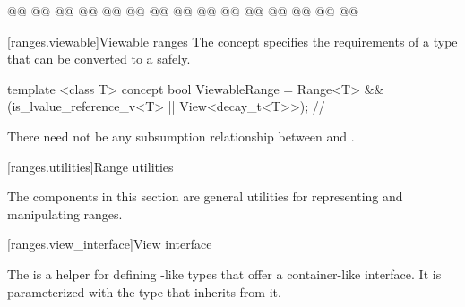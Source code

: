 \begin{codeblock}
{  @@
    @@
      @@
  @@
    @@
      @@
    @\removed{\};}@
  @@
    @@
      @@
    @\removed{\};}@
  @@
    @@
      @@
    @\removed{\};}@
}
\end{codeblock}


\setcounter{section}{6}
\setcounter{subsection}{10}
{\color{addclr}
[ranges.viewable]{Viewable ranges}
\pnum The  concept specifies the requirements of a 
type that can be converted to a  safely.

\begin{codeblock}
template <class T>
concept bool ViewableRange =
  Range<T> && (is_lvalue_reference_v<T> || View<decay_t<T>>); // \seebelow
\end{codeblock}

\pnum
There need not be any subsumption relationship between 
and .
}

[ranges.utilities]{Range utilities}

\pnum
The components in this section are general utilities for representing and manipulating
ranges.

[ranges.view_interface]{View interface}

\pnum
The  is a helper for defining -like types that offer a
container-like interface. It is parameterized with the type that inherits from it.

